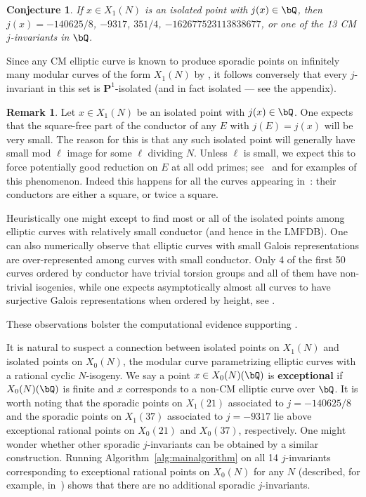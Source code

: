 \documentclass[11pt,reqno]{amsart}
\theoremstyle{plain}
\newtheorem{conjecture}[theorem]{Conjecture}
\theoremstyle{definition}
\newtheorem{remark}[theorem]{Remark}
\newcommand{\Q}{\bQ}
\newcommand{\PP}{\mathbf P}
\newcommand{\abedit}[1]{{\color{blue} #1}}
\begin{document}
\begin{conjecture}\label{conj}
If $x\in X_1(N)$ is an isolated point with $j(x) \in \Q$, then $j(x)=-140625/8$, $-9317$, $351/4$, $-162677523113838677$, or one of the 13 CM $j$-invariants in $\Q$.
\end{conjecture}

\noindent Since any CM elliptic curve is known to produce sporadic points on infinitely many modular curves of the form $X_1(N)$ by \cite[Theorem 7.1]{BELOV}, it follows conversely that every $j$-invariant in this set is $\PP^1$-isolated (and in fact isolated --- \abedit{see the appendix}).

\begin{remark}
Let $x\in X_1(N)$ be an isolated point with $j(x) \in \Q$. One expects that the square-free part of the conductor of any $E$ with $j(E) = j(x)$ will be very small. The reason for this is that any such isolated point will generally have small mod $\ell$ image for some $\ell$ dividing $N$. Unless $\ell$ is small, we expect this to force potentially good reduction on $E$ at all odd primes; see~\cite[Corollary 4.4]{Mazur1978} and \cite[Theorem 5.1]{BiluParent11} for examples of this phenomenon. Indeed this happens for all the curves appearing in~: their conductors are either a square, or twice a square.

Heuristically one might except to find most or all of the isolated points among elliptic curves with relatively small conductor (and hence in the LMFDB). One can also numerically observe that elliptic curves with small Galois representations are over-represented among curves with small conductor. Only 4 of the first 50 curves ordered by conductor have trivial torsion groups and all of them have non-trivial isogenies, while one expects asymptotically almost all curves to have surjective Galois representations when ordered by height, see \cite[Theorem 1]{Duke97}.

These observations bolster the computational evidence supporting .
\end{remark}



It is natural to suspect a connection between isolated points on $X_1(N)$ and isolated points on $X_0(N)$, the modular curve parametrizing elliptic curves with a rational cyclic $N$-isogeny. We say a point $x \in X_0(N)(\Q)$ is \textbf{exceptional} if $X_0(N)(\Q)$ is finite and $x$ corresponds to a non-CM elliptic curve over $\Q$. It is worth noting that the sporadic points on $X_1(21)$ associated to $j=-140625/8$ and the sporadic points on $X_1(37)$ associated to $j=-9317$ lie above exceptional rational points on $X_0(21)$ and $X_0(37)$, respectively. One might wonder whether other sporadic $j$-invariants can be obtained by a similar construction. Running Algorithm~\ref{alg:mainalgorithm} on all 14 $j$-invariants corresponding to exceptional rational points on $X_0(N)$ for any $N$ (described, for example, in~\cite[Table 4]{LRAnn}) shows that there are no additional sporadic $j$-invariants. 
\end{document}
